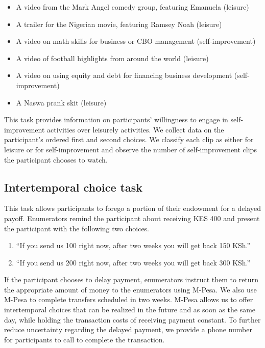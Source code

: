 \documentclass[11pt, a4paper]{article}\usepackage[]{graphicx}\usepackage[]{color}
\begin{document}
        \begin{itemize}
            \item A video from the Mark Angel comedy group, featuring Emanuela (leisure)
            \item A trailer for the Nigerian movie, featuring Ramsey Noah (leisure)
            \item A video on math skills for business or CBO management (self-improvement)
            \item A video of football highlights from around the world (leisure)
            \item A video on using equity and debt for financing business development (self-improvement)
            \item A Naswa prank skit (leisure)
        \end{itemize}

        This task provides information on participants' willingness to engage in self-improvement activities over leisurely activities. We collect data on the participant's ordered first and second choices. We classify each clip as either for leisure or for self-improvement and observe the number of self-improvement clips the participant chooses to watch.

    \subsection{Intertemporal choice task}

        This task allows participants to forego a portion of their endowment for a delayed payoff. Enumerators remind the participant about receiving KES 400 and present the participant with the following two choices.

        \begin{enumerate}
            \item ``If you send us 100 right now, after two weeks you will get back 150 KSh.''
            \item ``If you send us 200 right now, after two weeks you will get back 300 KSh.''
        \end{enumerate}

        If the participant chooses to delay payment, enumerators instruct them to return the appropriate amount of money to the enumerators using M-Pesa. We also use M-Pesa to complete transfers scheduled in two weeks. M-Pesa allows us to offer intertemporal choices that can be realized in the future and as soon as the same day, while holding the transaction costs of receiving payment constant. To further reduce uncertainty regarding the delayed payment, we provide a phone number for participants to call to complete the transaction.
\end{document}
